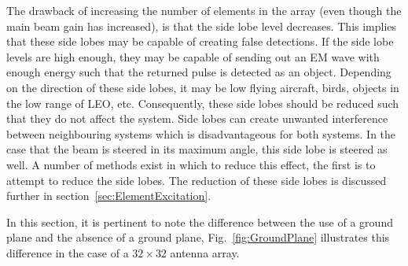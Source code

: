 \documentclass[11pt]{witseiepaper}
\begin{document}
The drawback of increasing the number of elements in the array (even though the main beam gain has increased), is that the side lobe level decreases. This implies that these side lobes may be capable of creating false detections. If the side lobe levels are high enough, they may be capable of sending out an EM wave with enough energy such that the returned pulse is detected as an object. Depending on the direction of these side lobes, it may be low flying aircraft, birds, objects in the low range of LEO, etc. Consequently, these side lobes should be reduced such that they do not affect the system.
Side lobes can create unwanted interference between neighbouring systems which is disadvantageous for both systems. In the case that the beam is steered in its maximum angle, this side lobe is steered as well. 
A number of methods exist in which to reduce this effect, the first is to attempt to reduce the side lobes.
The reduction of these side lobes is discussed further in section~\ref{sec:ElementExcitation}.

In this section, it is pertinent to note the difference between the use of a ground plane and the absence of a ground plane, Fig.~\ref{fig:GroundPlane} illustrates this difference in the case of a $32 \times 32$ antenna array.
\end{document}

